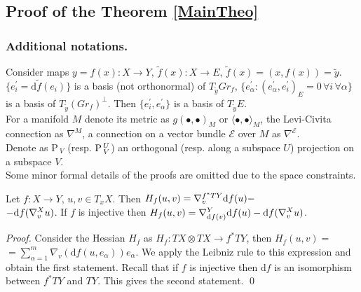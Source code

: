 \documentclass{llncs}
\newcommand{\Proj}{\mathrm{P}{\,}}
\newcommand{\ProjNonOrth}[2]{\tensor*{\Proj}{^{#1}_{#2}}}
\newcommand{\CovariantDiffManif}[1]{\nabla^{#1}}
\newcommand{\CovariantDerivManif}[2]{\tensor*{\nabla}{^{#1}_{#2}}}
\newcommand{\CovariantDeriv}[1]{\nabla_{#1}}
\newcommand{\Diff}{\mathrm{d}}
\newcommand{\TangentBundle}[1]{T{#1}}
\newcommand {\Preimage}[2]{{#2}^*{#1}}
\newcommand \TPreimage[2]{\Preimage{\TangentBundle{#1}}{#2}}
\newcommand {\bigeps}{\mathcal{E}}
\begin{document}
\subsection{Proof of the Theorem \ref{MainTheo}}
\subsubsection{Additional notations.}
Consider maps $y = f(x):X\to Y$, $\tilde{f}(x):X \to E$, $\tilde{f}(x)=(x,f(x))=\tilde{y}$. $\{e_i^{'}=\Diff \tilde{f}(e_i)\}$ is a basis (not orthonormal) of $T_{\tilde{y}} Gr_f$, 
$\{e_\alpha^{'}: (e_\alpha^{'},e_i^{'})_{E} = 0 \,\forall i \, \forall \alpha \}$ is a basis of $T_{\tilde{y}} (Gr_f)^{\bot}$. Then $\{e_i^{'}, e_\alpha^{'}\}$ is a basis of $T_{\tilde{y}} E$.
\\
For a manifold $M$ denote its metric as $g(∙,∙)_{M}$ or $\langle∙,∙\rangle_{M}$, the Levi-Civita connection as $\CovariantDiffManif{M}$, a connection on a vector bundle $\bigeps$ over $M$ as $\CovariantDiffManif{\bigeps}$. 
\\
Denote as $\Proj_V$ (resp. $\ProjNonOrth{U}{V}$) an orthogonal (resp. along a subspace $U$) projection on a subspace $V$.
\\
Some minor formal details of the proofs are omitted due to the space constraints.

\begin{proposition} \label{PropHessian}
Let $f:X\to Y$, $u, v\in T_x X$. Then
$H_f(u,v)=\CovariantDerivManif{\TPreimage{Y}{f}} {v} \Diff f(u) -$
\\
							$-\Diff f( 
							\CovariantDerivManif{X}{v}u
							)$.
							If $f$ is injective then 
							$H_f(u,v)=\CovariantDerivManif{Y}{ \Diff f(v)} \Diff f(u) - 
							\Diff f( 
							\CovariantDerivManif{X}{v}u
							)$.
\end{proposition}

\begin{proof}
Consider the Hessian $H_f$ as $H_f:\TangentBundle{X}\otimes\TangentBundle{X}\to \TPreimage{Y}{f}$, 
then $H_f(u, v)=$
\\
$= \sum_{\alpha=1}^m \CovariantDeriv{v}{(\Diff f(u, e_{\alpha}))} e_{\alpha}$. 
We apply the Leibniz rule to this expression and obtain the first statement. 
Recall that if $f$ is injective then $\Diff f$ is an isomorphism between $\TPreimage{Y}{f}$ and $TY$. This gives the second statement.
\qed
\end{proof}
\end{document}
